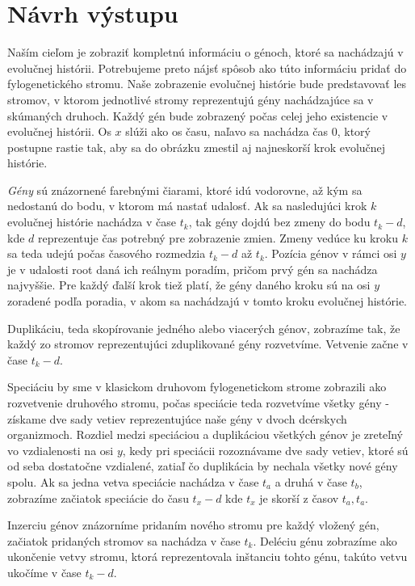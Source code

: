 \section{Návrh výstupu}
\label{sec:vykreslene}
Naším cieľom je zobraziť 
kompletnú informáciu o génoch, ktoré sa nachádzajú v evolučnej histórii.
Potrebujeme preto nájsť spôsob ako túto informáciu pridať do fylogenetického stromu.
Naše zobrazenie evolučnej histórie bude predstavovať
les stromov, v ktorom jednotlivé stromy reprezentujú gény nachádzajúce sa v skúmaných druhoch. 
Každý gén bude zobrazený počas celej jeho existencie v evolučnej histórii. 
Os $x$ slúži ako os času, naľavo sa nachádza čas 0, ktorý postupne rastie tak, aby sa do obrázku zmestil aj najneskorší krok evolučnej histórie.

\emph{Gény} sú znázornené farebnými čiarami, ktoré idú vodorovne, až kým sa nedostanú do bodu, v ktorom má nastať udalosť.
Ak sa nasledujúci krok $k$ evolučnej histórie nachádza v čase $t_k$, tak gény dojdú bez zmeny do bodu $t_k - d$,
kde $d$ reprezentuje čas potrebný pre zobrazenie zmien. Zmeny vedúce ku kroku $k$ sa teda udejú počas časového rozmedzia $t_k - d$ až $t_k$.
Pozícia génov v rámci osi $y$ je v udalosti root daná ich reálnym poradím, pričom prvý gén sa nachádza najvyššie.
Pre každý ďalší krok tiež platí, že gény daného kroku sú na osi $y$ zoradené podľa poradia, v akom sa nachádzajú v tomto kroku evolučnej histórie.

Duplikáciu, teda skopírovanie jedného alebo viacerých génov, zobrazíme tak, že každý zo stromov reprezentujúci zduplikované gény rozvetvíme. 
Vetvenie začne v čase $t_k - d$.

Speciáciu by sme v klasickom druhovom fylogenetickom strome zobrazili ako rozvetvenie druhového stromu,
počas speciácie teda rozvetvíme všetky gény
- získame dve sady vetiev reprezentujúce naše gény v dvoch dcérskych organizmoch.
Rozdiel medzi speciáciou a duplikáciou všetkých génov je zreteľný vo vzdialenosti na osi $y$,
kedy pri speciácii rozoznávame dve sady vetiev, ktoré sú od seba dostatočne vzdialené,
zatiaľ čo duplikácia by nechala všetky nové gény spolu. Ak sa jedna vetva speciácie nachádza v čase $t_a$ a druhá v čase $t_b$, zobrazíme 
začiatok speciácie do času $t_x - d$ kde $t_x$ je skorší z časov $t_a,t_a$.

Inzerciu génov znázorníme pridaním nového stromu pre každý vložený gén, začiatok pridaných stromov sa nachádza v čase $t_k$.
Deléciu génu zobrazíme ako ukončenie vetvy stromu, ktorá reprezentovala inštanciu tohto génu, takúto vetvu ukočíme v čase $t_k - d$.

